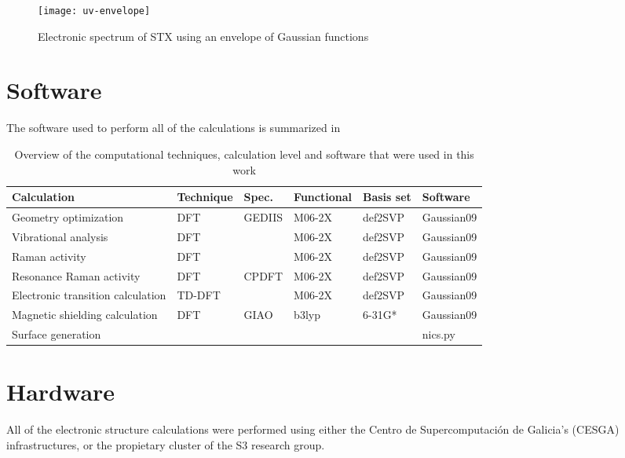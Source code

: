 \begin{figure}
    \centering
    \texttt{[image: uv-envelope]}
    \caption[Electronic spectrum with Gaussian envelopes]{Electronic spectrum of STX using an envelope of Gaussian functions}
\end{figure}


\section{Software}

The software used to perform all of the calculations is summarized in 

\begin{table*}[h]
    \centering
    \caption[Overview of techniques, level and software]{Overview of the computational techniques, calculation level and software that were used in this work}
    \begin{tabular}{@{}llllll@{}}
        \toprule
        Calculation & Technique & Spec. & Functional & Basis set & Software \\
        \midrule
        Geometry optimization                   & DFT       & GEDIIS    & M06-2X & def2SVP & Gaussian09 \\
        Vibrational analysis                    & DFT       &           & M06-2X & def2SVP & Gaussian09 \\
        Raman activity                          & DFT       &           & M06-2X & def2SVP & Gaussian09 \\
        Resonance Raman activity                & DFT       & CPDFT     & M06-2X & def2SVP & Gaussian09 \\
        Electronic transition calculation       & TD-DFT    &           & M06-2X & def2SVP & Gaussian09 \\
        Magnetic shielding calculation          & DFT       & GIAO      & b3lyp  & 6-31G*  & Gaussian09 \\
        Surface generation                      &           &           & & & nics.py \\
        \bottomrule
    \end{tabular}
\end{table*}


\section{Hardware}
All of the electronic structure calculations were performed using either the Centro de Supercomputación de Galicia's (CESGA) infrastructures, or the propietary cluster of the S3 research group.

